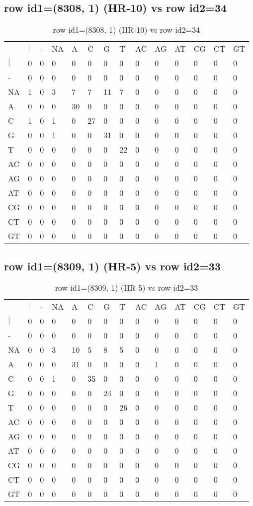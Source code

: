 \subsection{row id1=(8308, 1) (HR-10) vs row id2=34}
\begin{center}
\begin{longtable}{|l|l|l|l|l|l|l|l|l|l|l|l|l|l|}
\caption{row id1=(8308, 1) (HR-10) vs row id2=34} \label{table_dm296}\\
\hline
\\
\hline
&$|$&-&NA&A&C&G&T&AC&AG&AT&CG&CT&GT\\
$|$&0&0&0&0&0&0&0&0&0&0&0&0&0\\
-&0&0&0&0&0&0&0&0&0&0&0&0&0\\
NA&1&0&3&7&7&11&7&0&0&0&0&0&0\\
A&0&0&0&30&0&0&0&0&0&0&0&0&0\\
C&1&0&1&0&27&0&0&0&0&0&0&0&0\\
G&0&0&1&0&0&31&0&0&0&0&0&0&0\\
T&0&0&0&0&0&0&22&0&0&0&0&0&0\\
AC&0&0&0&0&0&0&0&0&0&0&0&0&0\\
AG&0&0&0&0&0&0&0&0&0&0&0&0&0\\
AT&0&0&0&0&0&0&0&0&0&0&0&0&0\\
CG&0&0&0&0&0&0&0&0&0&0&0&0&0\\
CT&0&0&0&0&0&0&0&0&0&0&0&0&0\\
GT&0&0&0&0&0&0&0&0&0&0&0&0&0\\
\hline
\end{longtable}
\end{center}

\subsection{row id1=(8309, 1) (HR-5) vs row id2=33}
\begin{center}
\begin{longtable}{|l|l|l|l|l|l|l|l|l|l|l|l|l|l|}
\caption{row id1=(8309, 1) (HR-5) vs row id2=33} \label{table_dm298}\\
\hline
\\
\hline
&$|$&-&NA&A&C&G&T&AC&AG&AT&CG&CT&GT\\
$|$&0&0&0&0&0&0&0&0&0&0&0&0&0\\
-&0&0&0&0&0&0&0&0&0&0&0&0&0\\
NA&0&0&3&10&5&8&5&0&0&0&0&0&0\\
A&0&0&0&31&0&0&0&0&1&0&0&0&0\\
C&0&0&1&0&35&0&0&0&0&0&0&0&0\\
G&0&0&0&0&0&24&0&0&0&0&0&0&0\\
T&0&0&0&0&0&0&26&0&0&0&0&0&0\\
AC&0&0&0&0&0&0&0&0&0&0&0&0&0\\
AG&0&0&0&0&0&0&0&0&0&0&0&0&0\\
AT&0&0&0&0&0&0&0&0&0&0&0&0&0\\
CG&0&0&0&0&0&0&0&0&0&0&0&0&0\\
CT&0&0&0&0&0&0&0&0&0&0&0&0&0\\
GT&0&0&0&0&0&0&0&0&0&0&0&0&0\\
\hline
\end{longtable}
\end{center}

